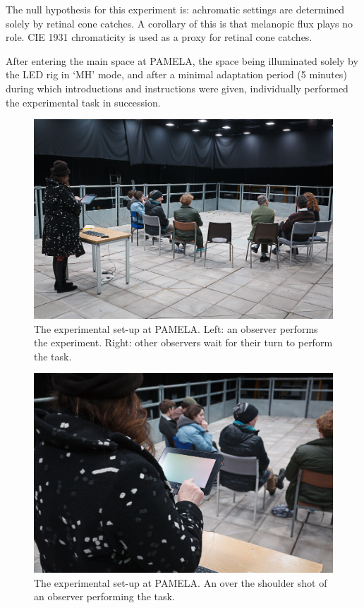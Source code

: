 The null hypothesis for this experiment is: achromatic settings are determined solely by retinal cone catches. A corollary of this is that melanopic flux plays no role. CIE 1931 chromaticity is used as a proxy for retinal cone catches.




After entering the main space at \gls{PAMELA}, the space being illuminated solely by the \gls{LED} rig in `MH' mode, and after a minimal adaptation period (5 minutes) during which introductions and instructions were given, individually performed the experimental task in succession. 

\begin{figure}[hbp]
\includegraphics[width=\textwidth]{figs/tablet/PAMELAobs1.jpg} 
\caption{The experimental set-up at \gls{PAMELA}. Left: an observer performs the experiment. Right: other observers wait for their turn to perform the task.}
\label{fig:PAMELAobs1}
\end{figure}

\begin{figure}[hbp]
\includegraphics[width=\textwidth]{figs/tablet/PAMELAobs2.jpg} 
\caption{The experimental set-up at \gls{PAMELA}. An over the shoulder shot of an observer performing the task.}
\label{fig:PAMELAobs2}
\end{figure}

